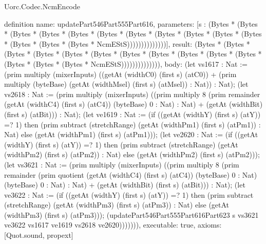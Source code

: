 \begin{lexlean}{Uorc.Codec.NcmEncode}
\begin{semanticmodule}
definition{
  name: updatePart546Part555Part616,
  parameters: [s : (Bytes * (Bytes * (Bytes * (Bytes * (Bytes * (Bytes * (Bytes * (Bytes * (Bytes * (Bytes * (Bytes * (Bytes * (Bytes * (Bytes * NcmEStS))))))))))))))],
  result: (Bytes * (Bytes * (Bytes * (Bytes * (Bytes * (Bytes * (Bytes * (Bytes * (Bytes * (Bytes * (Bytes * (Bytes * (Bytes * (Bytes * NcmEStS)))))))))))))),
  body: (let vs1617 : Nat := (prim multiply (mixerInputs) ((getAt (widthC0) (first s) (atC0)) + (prim multiply (byteBase) (getAt (widthMsel) (first s) (atMsel)) : Nat)) : Nat); (let vs2618 : Nat := (prim multiply (mixerInputs) ((prim multiply 8 (prim remainder (getAt (widthC4) (first s) (atC4)) (byteBase) 0 : Nat) : Nat) + (getAt (widthBit) (first s) (atBit))) : Nat); (let ve1619 : Nat := (if ((getAt (widthY) (first s) (atY)) =? 1) then (prim subtract (stretchRange) (getAt (widthPm1) (first s) (atPm1)) : Nat) else (getAt (widthPm1) (first s) (atPm1))); (let ve2620 : Nat := (if ((getAt (widthY) (first s) (atY)) =? 1) then (prim subtract (stretchRange) (getAt (widthPm2) (first s) (atPm2)) : Nat) else (getAt (widthPm2) (first s) (atPm2))); (let vs3621 : Nat := (prim multiply (mixerInputs) ((prim multiply 8 (prim remainder (prim quotient (getAt (widthC4) (first s) (atC4)) (byteBase) 0 : Nat) (byteBase) 0 : Nat) : Nat) + (getAt (widthBit) (first s) (atBit))) : Nat); (let ve3622 : Nat := (if ((getAt (widthY) (first s) (atY)) =? 1) then (prim subtract (stretchRange) (getAt (widthPm3) (first s) (atPm3)) : Nat) else (getAt (widthPm3) (first s) (atPm3))); (updatePart546Part555Part616Part623 s vs3621 ve3622 vs1617 ve1619 vs2618 ve2620))))))),
  executable: true,
  axioms: [Quot.sound, propext]
}


\end{semanticmodule}
\end{lexlean}

